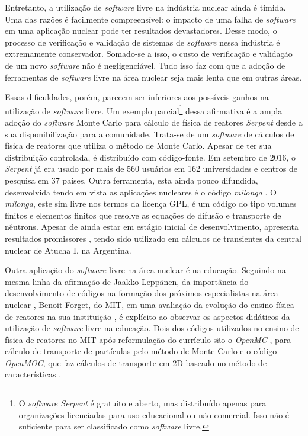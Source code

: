 Entretanto, a utilização de \textit{software} livre na indústria nuclear ainda é tímida.
Uma das razões é facilmente compreensível: o impacto de uma falha de \textit{software}
em uma aplicação nuclear pode ter resultados devastadores. Desse modo, o processo de
verificação e validação de sistemas de \textit{software} nessa indústria é extremamente
conservador. Somado-se a isso, o custo de verificação e validação de um novo \textit{software}
não é negligenciável. Tudo isso faz com que a adoção de ferramentas de \textit{software}
livre na área nuclear seja mais lenta que em outras áreas.

Essas dificuldades, porém, parecem ser inferiores aos possíveis ganhos na utilização de
\textit{software} livre. Um exemplo parcial\footnote{O \textit{software Serpent} é gratuito
  e aberto, mas distribuído apenas para organizações licenciadas para uso educacional ou não-comercial.
Isso não é suficiente para ser classificado como \textit{software} livre.} dessa afirmativa é a ampla adoção
do \textit{software} Monte Carlo para cálculo de física de reatores \textit{Serpent} \cite{Serpent2013}
desde a sua disponibilização para a comunidade. Trata-se de um \textit{software}
de cálculos de física de reatores que utiliza o método de Monte Carlo. Apesar
de ter sua distribuição controlada, é distribuído com código-fonte. Em setembro
de 2016, o \textit{Serpent} já era usado por mais de 560 usuários em 162 universidades
e centros de pesquisa em 37 países. Outra ferramenta, esta ainda pouco difundida,
desenvolvida tendo em vista as aplicações nucleares é o código \textit{milonga} \cite{Theler2014b}.
O \textit{milonga}, este sim livre nos termos da licença GPL, é um código do tipo volumes finitos e elementos finitos que resolve as equações
de difusão e transporte de nêutrons. Apesar de ainda estar em estágio inicial de
desenvolvimento, apresenta resultados promissores \cite{Theler2014}, tendo sido
utilizado em cálculos de transientes da central nuclear de Atucha I, na Argentina.

Outra aplicação do \textit{software} livre na área nuclear é na educação. Seguindo na
mesma linha da afirmação de Jaakko Leppänen, da importância do desenvolvimento de
códigos na formação dos próximos especialistas na área nuclear \cite{Leppanen2015}, Benoit
Forget, do MIT, em uma avaliação da evolução do ensino física de reatores na sua instituição \cite{Forget2014}, é explícito ao observar os aspectos didáticos da
utilização de \textit{software} livre na educação. Dois dos códigos utilizados
no ensino de física de reatores no MIT após reformulação do currículo são o \textit{OpenMC}
\cite{Romano2013}, para cálculo de transporte de partículas pelo método de Monte Carlo e
o código \textit{OpenMOC}, que faz cálculos de transporte em 2D baseado
no método de características \cite{Boyd2014}.

